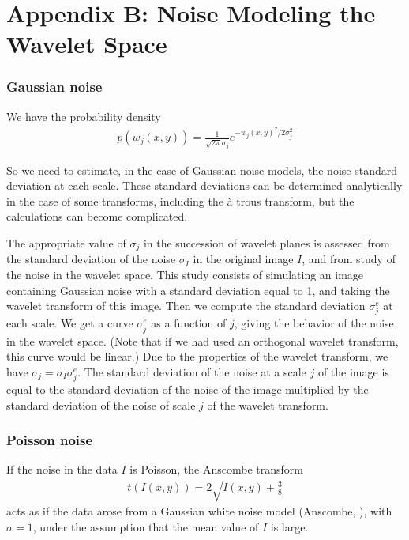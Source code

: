 \chapter*{Appendix B: Noise Modeling the Wavelet Space}
 

\subsection*{Gaussian noise}
We have the probability density
\begin{eqnarray}
p(w_j(x,y)) = \frac{1}{\sqrt{2\pi} \sigma_j} e^{{-w_j(x,y)^2}/2\sigma^2_j} 
\end{eqnarray}

So we need to estimate, in the case of Gaussian noise models,
 the noise standard deviation at each scale.  These standard deviations can 
be determined analytically in the case of some transforms, including the 
\`a trous transform, but the calculations can become complicated.  

The appropriate value of $\sigma_j$ 
in the succession of wavelet planes is assessed 
from the standard deviation of the noise $\sigma_I$ in the original image
$I$, 
and from study of the noise in the wavelet space.  This study consists of 
simulating an image containing Gaussian noise with a standard deviation 
equal to 1, and taking the wavelet transform of this image.  Then we
compute the standard deviation $\sigma^e_j$ at each scale.  We get a curve 
$\sigma^e_j$ as a function of $j$, giving the behavior of the noise in the 
wavelet space.
(Note that if we had used an orthogonal wavelet transform, this curve would
be linear.)  Due to the properties of the wavelet transform, we have 
$ \sigma_j = \sigma_I \sigma^e_j $.
The standard deviation of the noise at a scale $j$ of the image is equal to
the standard deviation of the noise of the image multiplied by the 
standard deviation of the noise of  scale $j$ of the wavelet transform.
 
\subsection*{Poisson noise}

If the noise in the data $I$ is Poisson, the Anscombe transform 
\begin{eqnarray}
t(I(x,y)) = 2\sqrt{I(x,y) + \frac{3}{8}}
\label{eqn_noise_anscombe}
\end{eqnarray}
acts as if the data arose from a
Gaussian white noise model (Anscombe, \cite{rest:anscombe48}), 
with $\sigma = 1$, under the
assumption that the mean value of $I$ is large.

